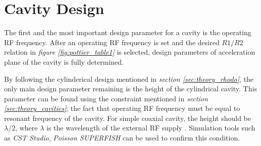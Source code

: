 \documentclass{article}
\begin{document}
\newcommand{\vecthreeBF}[1]{\vec{\textbf{#1}}}
\newcommand{\vecthree}[1]{\vec{#1}}

\newcommand{\parDeriv}[2]{\frac{\partial #1}{\partial #2}}
\newcommand{\parDerivS}[2]{\frac{\partial^2 #1}{\partial #2^2}}
\newcommand{\derivS}[2]{\frac{d^2 #1}{d#2^2}}

\newcommand{\dotProdBF}[2]{\vecthreeBF{#1} \cdot \vecthreeBF{#2}}
\newcommand{\dotProd}[2]{\vecthree{#1} \cdot \vecthree{#2}}

\newcommand{\crossProdBF}[2]{\vecthreeBF{#1} \times \vecthreeBF{#2}}
\newcommand{\crossProd}[2]{\vecthree{#1} \times \vecthree{#2}}


\newcommand{\fromeq}[1]{\textit{equation \ref{eq:#1}}}
\newcommand{\fromeqs}[2]{\textit{equations \ref{eq:#1} and \ref{eq:#2}}}

\newcommand{\fromfig}[1]{\textit{figure \ref{fig:#1}}}
\newcommand{\fromfigs}[2]{\textit{figures \ref{fig:#1} and \ref{fig:#2}}}
\newcommand{\fromsec}[1]{\textit{section \ref{sec:#1}}}



\section{Cavity Design} \label{sec:cavity_design}

The first and the most important design parameter for a cavity is the operating RF frequency.
After an operating RF frequency is set and the desired $R1/R2$ relation in \fromfig{pottier_table1} is selected, design parameters of acceleration plane of the cavity is fully determined.

By following the cylinderical design mentioned in \fromsec{theory_rhodo}, the only main design parameter remaining is the height of the cylindrical cavity.
This parameter can be found using the constraint mentioned in \fromsec{theory_cavities}; the fact that operating RF frequency must be equal to resonant frequency of the cavity.
For simple coaxial cavity, the height should be $\lambda/2$, where $\lambda$ is the wavelength of the external RF supply \cite{rhodo_pottier}.
Simulation tools such as \textit{CST Studio}, \textit{Poisson SUPERFISH} can be used to confirm this condition.
\end{document}
